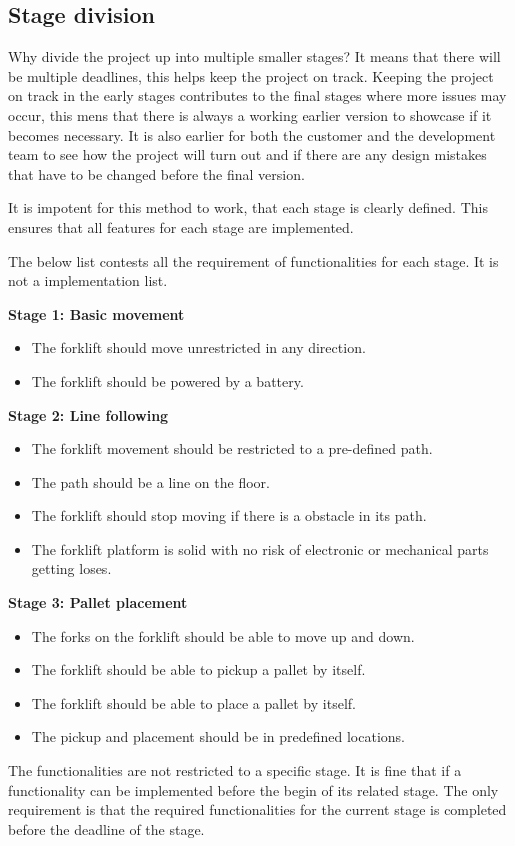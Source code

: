 \documentclass[../report.tex]{subfiles}
\begin{document}
    \subsection{Stage division}
    Why divide the project up into multiple smaller stages? It means
    that there will be multiple deadlines, this helps keep the project on
    track. Keeping the project on track in the early stages contributes to the
    final stages where more issues may occur, this mens that there is always a
    working earlier version to showcase if it becomes necessary. It is also
    earlier for both the customer and the development team to see how the
    project will turn out and if there are any design mistakes that have to be
    changed before the final version.

    It is impotent for this method to work, that each stage is clearly defined.
    This ensures that all features for each stage are implemented.

    The below list contests all the requirement of functionalities for each
    stage. It is not a implementation list.

    \textbf{Stage 1: Basic movement}
    \begin{itemize}
        \item The forklift should move unrestricted in any direction.
        \item The forklift should be powered by a battery.
    \end{itemize}

    \textbf{Stage 2: Line following}
    \begin{itemize}
        \item The forklift movement should be restricted to a pre-defined path.
        \item The path should be a line on the floor.
        \item The forklift should stop moving if there is a obstacle in its path.
        \item The forklift platform is solid with no risk of electronic or
        mechanical parts getting loses.
    \end{itemize}

    \textbf{Stage 3: Pallet placement}
    \begin{itemize}
        \item The forks on the forklift should be able to move up and down.
        \item The forklift should be able to pickup a pallet by itself.
        \item The forklift should be able to place a pallet by itself.
        \item The pickup and placement should be in predefined locations.
    \end{itemize}

    The functionalities are not restricted to a specific stage. It is fine that
    if a functionality can be implemented before the begin of its related
    stage.
    The only requirement is that the required functionalities for the current
    stage is completed before the deadline of the stage. 
\end{document}
